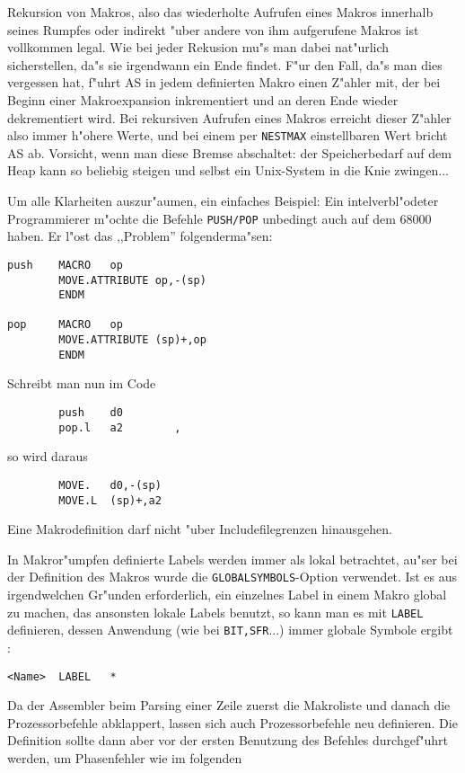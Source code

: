\documentclass[12pt,a4paper,twoside]{report}
\newcommand{\tty}[1]{{\tt #1}}
\begin{document}
Rekursion von Makros, also das wiederholte Aufrufen eines Makros innerhalb
seines Rumpfes oder indirekt "uber andere von ihm aufgerufene Makros ist
vollkommen legal.  Wie bei jeder Rekusion mu"s man dabei nat"urlich
sicherstellen, da"s sie irgendwann ein Ende findet.  F"ur den Fall, da"s
man dies vergessen hat, f"uhrt AS in jedem definierten Makro einen Z"ahler
mit, der bei Beginn einer Makroexpansion inkrementiert und an deren Ende
wieder dekrementiert wird.  Bei rekursiven Aufrufen eines Makros erreicht
dieser Z"ahler also immer h"ohere Werte, und bei einem per {\tt NESTMAX}
einstellbaren Wert bricht AS ab.  Vorsicht, wenn man diese Bremse
abschaltet: der Speicherbedarf auf dem Heap kann so beliebig steigen und
selbst ein Unix-System in die Knie zwingen...
\par
Um alle Klarheiten auszur"aumen, ein einfaches Beispiel:
Ein intelverbl"odeter Programmierer m"ochte die Befehle \tty{PUSH/POP}
unbedingt auch auf dem 68000 haben.  Er l"ost das ,,Problem''
folgenderma"sen:
\begin{verbatim}
push    MACRO   op
        MOVE.ATTRIBUTE op,-(sp)
        ENDM

pop     MACRO   op
        MOVE.ATTRIBUTE (sp)+,op
        ENDM
\end{verbatim}
Schreibt man nun im Code
\begin{verbatim}
        push    d0
        pop.l   a2        ,
\end{verbatim}
so wird daraus
\begin{verbatim}
        MOVE.   d0,-(sp)
        MOVE.L  (sp)+,a2
\end{verbatim}
Eine Makrodefinition darf nicht "uber Includefilegrenzen hinausgehen.
\par
In Makror"umpfen definierte Labels werden immer als lokal betrachtet,
au"ser bei der Definition des Makros wurde die
\tty{GLOBALSYMBOLS}-Option verwendet.  Ist es aus irgendwelchen Gr"unden
erforderlich, ein einzelnes Label in einem Makro global zu
machen, das ansonsten lokale Labels benutzt, so kann man es mit
\tty{LABEL} definieren, dessen Anwendung (wie bei \tty{BIT,SFR}...)
immer globale Symbole ergibt :
\begin{verbatim}
<Name>  LABEL   *
\end{verbatim}
Da der Assembler beim Parsing einer Zeile zuerst die Makroliste und
danach die Prozessorbefehle abklappert, lassen sich auch Prozessorbefehle
neu definieren.  Die Definition sollte dann aber vor der ersten Benutzung
des Befehles durchgef"uhrt werden, um Phasenfehler wie im folgenden
\end{document}
